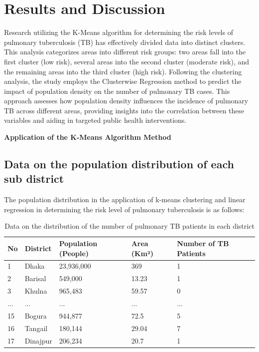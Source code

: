 \documentclass[conference]{IEEEtran}
\begin{document}
    \section{Results and Discussion}

    Research utilizing the K-Means algorithm for determining the risk levels of pulmonary tuberculosis (TB) has effectively divided data into distinct clusters. This analysis categorizes areas into different risk groups: two areas fall into the first cluster (low risk), several areas into the second cluster (moderate risk), and the remaining areas into the third cluster (high risk).
Following the clustering analysis, the study employs the Clusterwise Regression method to predict the impact of population density on the number of pulmonary TB cases. This approach assesses how population density influences the incidence of pulmonary TB across different areas, providing insights into the correlation between these variables and aiding in targeted public health interventions.
    
    \textbf{Application of the K-Means Algorithm Method}
    
    \subsection{Data on the population distribution of each sub district}
    The population distribution in the application of k-means clustering and linear regression in determining the risk level of pulmonary tuberculosis is as follows:
    
    \begin{table}[H]
        \centering
        \begin{tabularx}{\linewidth}{|X|X|X|X|X|}
        \hline
        No & District & Population (People) & Area (Km²) & Number of TB Patients \\
        \hline
        1 & Dhaka & 23,936,000 & 369 & 1 \\ \hline
        2 & Barisal & 549,000 & 13.23 & 1 \\ \hline
        3 & Khulna & 965,483 & 59.57 & 0 \\ \hline
        ... & ... & ... & ... & ... \\ \hline
        15 & Bogura & 944,877 & 72.5 & 5 \\ \hline
        16 & Tangail & 180,144 & 29.04 & 7 \\ \hline
        17 & Dinajpur & 206,234 & 20.7 & 1 \\
        \hline
        \end{tabularx}
        \caption{Data on the distribution of the number of pulmonary TB patients in each district}
        \label{tab:tb_data}
        \end{table}
    
\end{document}

